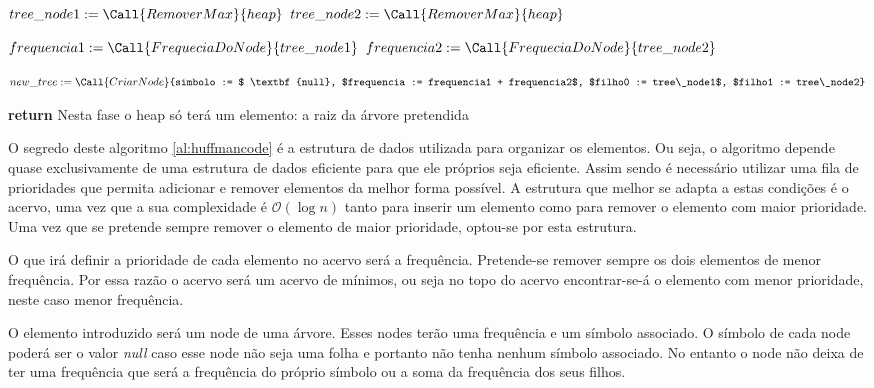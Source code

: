 \documentclass{article}
\begin{document}
\begin{algorithm}[H]
\caption{}
\label{al:huffmancode}
\begin{algorithmic}
		\State $tree\_node1 := \Call{RemoverMax}{heap}$
		\State $tree\_node2 := \Call{RemoverMax}{heap}$
		
		\State		
		
		\State $frequencia1 := \Call{FrequeciaDoNode}{tree\_node1}$
		\State $frequencia2 := \Call{FrequeciaDoNode}{tree\_node2}$
		
		\State
		
		\State $new\_tree := \Call{CriarNode}{simbolo := $ \textbf{null}, $frequencia := frequencia1 + frequencia2$, $filho0 := tree\_node1$, $filho1 := tree\_node2}$
		
		\State
		
		\State {}
	\EndWhile
	
	\State \textbf{return}  \Comment Nesta fase o heap só terá um elemento: a raiz da árvore pretendida
\EndFunction
\end{algorithmic}
\end{algorithm}

O segredo deste algoritmo \ref{al:huffmancode} é a estrutura de dados utilizada para organizar os elementos. Ou seja, o algoritmo depende quase exclusivamente de uma estrutura de dados eficiente para que ele próprios seja eficiente. Assim sendo é necessário utilizar uma fila de prioridades que permita adicionar e remover elementos da melhor forma possível. A estrutura que melhor se adapta a estas condições é o acervo, uma vez que a sua complexidade é $\mathcal{O}(\log{}n)$ tanto para inserir um elemento como para remover o elemento com maior prioridade. Uma vez que se pretende sempre remover o elemento de maior prioridade, optou-se por esta estrutura.

O que irá definir a prioridade de cada elemento no acervo será a frequência. Pretende-se remover sempre os dois elementos de menor frequência. Por essa razão o acervo será um acervo de mínimos, ou seja no topo do acervo encontrar-se-á o elemento com menor prioridade, neste caso menor frequência.

O elemento introduzido será um node de uma árvore. Esses nodes terão uma frequência e um símbolo associado. O símbolo de cada node poderá ser o valor \textit{null} caso esse node não seja uma folha e portanto não tenha nenhum símbolo associado. No entanto o node não deixa de ter uma frequência que será a frequência do próprio símbolo ou a soma da frequência dos seus filhos.
\end{document}

